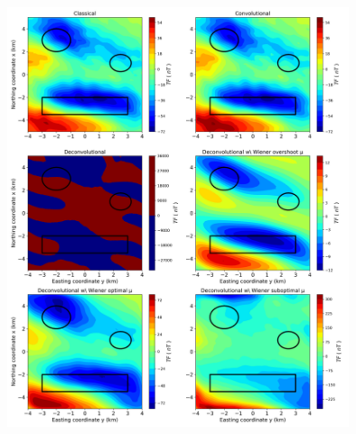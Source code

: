 \begin{figure}[htbp]
	\begin{center}
		\includegraphics[width=10cm]{Fig/stability_mag_comparison}
	\end{center}
	\caption{}
	\label{fig:8}
\end{figure}



%


